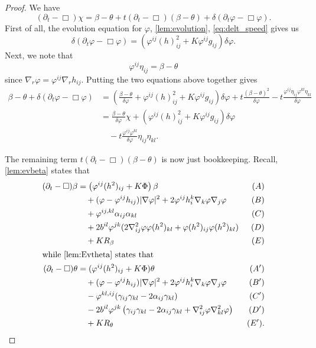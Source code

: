 \documentclass{amsart}
\begin{document}
\begin{proof}
We have
\[
(\partial_t - \Box)\chi = \beta - \theta + t(\partial_{t} - \Box)(\beta - \theta) + \delta(\partial_t \varphi - \Box\varphi).
\]
First of all, the evolution equation for \(\varphi\), \cref{lem:evolution}, \cref{eq:delt_speed} gives us
\[
\delta(\partial_t \varphi - \Box\varphi) = \left(\varphi^{ij}(h)^2_{ij} + K\varphi^{ij}g_{ij}\right)\delta\varphi.
\]
Next, we note that
\[
\varphi^{ij} \eta_{ij} = \beta - \theta
\]
since \(\nabla_r \varphi = \varphi^{ij} \nabla_r h_{ij}\). Putting the two equations above together gives
\begin{equation}
\label{eq:deltchi1}
\begin{split}
\beta - \theta + \delta(\partial_t \varphi - \Box\varphi) &= \left(\frac{\beta-\theta}{\delta\varphi} + \varphi^{ij}(h)^2_{ij} + K\varphi^{ij}g_{ij}\right)\delta\varphi + t \frac{(\beta - \theta)^2}{\delta\varphi} - t \frac{\varphi^{ij}\eta_{ij} \varphi^{kl}\eta_{kl}}{\delta\varphi} \\
&= \frac{\beta-\theta}{\delta\varphi} \chi + \left(\varphi^{ij}(h)^2_{ij} + K\varphi^{ij}g_{ij}\right)\delta\varphi \\
&\quad - t \frac{\varphi^{ij}\varphi^{kl}}{\delta\varphi} \eta_{ij}\eta_{kl}.
\end{split}
\end{equation}

The remaining term \(t(\partial_{t} - \Box)(\beta - \theta)\) is now just bookkeeping. Recall, \cref{lem:evbeta} states that
\begin{align*}
(\partial_{t} - \Box)\beta &= \left(\varphi^{ij}(h^2)_{ij} + K\Phi \right)\beta  & (A) \\
&\quad + (\varphi - \varphi^{ij}h_{ij}) |\nabla\varphi|^{2} + 2\varphi^{ij}h^{k}_{i}\nabla_k \varphi \nabla_j \varphi  & (B) \\
&\quad + \varphi^{ij,kl} \alpha_{ij} \alpha_{kl} & (C) \\
&\quad + 2b^{il}\varphi^{jk} (2\nabla^2_{ij}\varphi\varphi(h^2)_{kl} + \varphi(h^2)_{ij}\varphi(h^2)_{kl}) & (D) \\
&\quad + KR_{\beta}  & (E) \\
\intertext{while \cref{lem:Evtheta} states that}
(\partial_{t} - \Box)\theta &= (\varphi^{ij}(h^2)_{ij} + K\Phi)\theta & (A') \\
&\quad + (\varphi - \varphi^{ij}h_{ij})|\nabla\varphi|^{2} + 2\varphi^{ij}h^{k}_{i}\nabla_k\varphi\nabla_j\varphi & (B') \\
&\quad - \varphi^{kl,ij} (\gamma_{ij}\gamma_{kl}  - 2\alpha_{ij} \gamma_{kl}) & (C') \\
&\quad - 2b^{il} \varphi^{jk} \left(\gamma_{ij} \gamma_{kl} - 2\alpha_{ij} \gamma_{kl} + \nabla^2_{ij}\varphi\nabla^2_{kl}\varphi\right) & (D') \\
&\quad + KR_{\theta} & (E').
\end{align*}


\end{proof}
\end{document}
